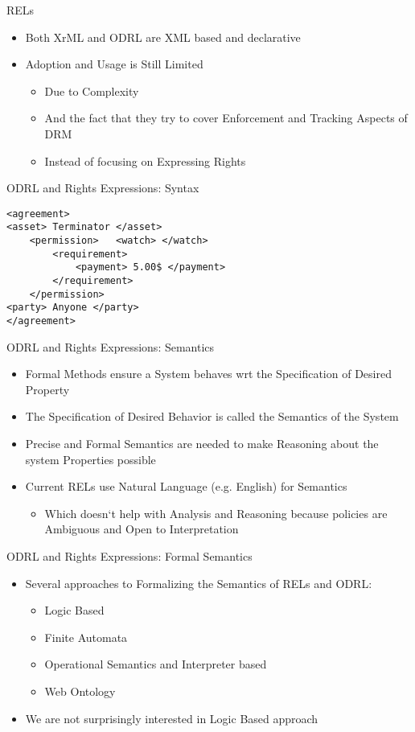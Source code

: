 \documentclass{beamer}
\begin{document}
\begin{frame}[fragile]{RELs}
\LARGE
\begin{itemize}
\item Both XrML and ODRL are XML based and declarative
\item Adoption and Usage is Still Limited
   \begin{itemize}
   \item Due to Complexity 
   \item And the fact that they try to cover Enforcement and Tracking Aspects of DRM
   \item Instead of focusing on Expressing Rights
   \end{itemize}
\end{itemize}
\end{frame}
\begin{frame}[fragile]{ODRL and Rights Expressions: Syntax}
\lstset{language=XML}
\begin{lstlisting}[caption={Syntax of Policies in XML}]
<agreement> 
<asset> Terminator </asset> 
	<permission>   <watch> </watch>  
		<requirement>   
			<payment> 5.00$ </payment>
		</requirement> 
	</permission> 
<party> Anyone </party>
</agreement>
\end{lstlisting}
\end{frame}
\begin{frame}[fragile]{ODRL and Rights Expressions: Semantics}
\Large
\begin{itemize}
\item Formal Methods ensure a System behaves wrt the Specification of Desired Property
\item The Specification of Desired Behavior is called the Semantics of the System
\item Precise and Formal Semantics are needed to make Reasoning about the system Properties possible
\item Current RELs use Natural Language (e.g. English) for Semantics
   \begin{itemize}
    \item Which doesn`t help with Analysis and Reasoning because policies are Ambiguous and Open to Interpretation
    \end{itemize}    
\end{itemize}
\end{frame}
\begin{frame}[fragile]{ODRL and Rights Expressions: Formal Semantics}
\LARGE
\begin{itemize}
\item Several approaches to Formalizing the Semantics of RELs and ODRL:
   \begin{itemize}
      \item Logic Based
      \item Finite Automata
      \item Operational Semantics and Interpreter based
      \item Web Ontology
    \end{itemize}
\item We are not surprisingly interested in Logic Based approach
\end{itemize}
\end{frame}
\end{document}
